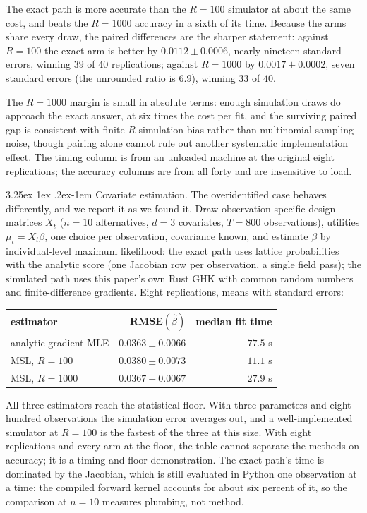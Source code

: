 \documentclass[11pt]{article}
\makeatletter
\renewcommand\paragraph{\@startsection{paragraph}{4}{\z@}%
  {3.25ex \@plus1ex \@minus.2ex}{-1em}%
  {\normalfont\normalsize\itshape}}
\makeatother
\begin{document}
\noindent The exact path is more accurate than the $R=100$ simulator at
about the same cost, and beats the $R=1000$ accuracy in a sixth of its
time. Because the arms share every draw, the paired differences
are the sharper statement: against $R=100$ the exact arm is better by
$0.0112\pm0.0006$, nearly nineteen standard errors, winning $39$ of $40$
replications; against $R=1000$ by $0.0017\pm0.0002$, seven standard
errors (the unrounded ratio is $6.9$), winning $33$ of $40$.

The $R=1000$ margin is small in absolute terms: enough simulation draws do approach the exact answer,
at six times the cost per fit, and the surviving paired gap is
consistent with finite-$R$ simulation bias rather than multinomial
sampling noise, though pairing alone cannot rule out another systematic
implementation effect. The timing column is from
an unloaded machine at the original eight replications; the accuracy
columns are from all forty and are insensitive to load.

\paragraph{Covariate estimation.} The overidentified case behaves
differently, and we report it as we found it. Draw observation-specific
design matrices $X_t$ ($n=10$ alternatives, $d=3$ covariates,
$T=800$ observations), utilities $\mu_t=X_t\beta$, one choice per
observation, covariance known, and estimate $\beta$ by individual-level
maximum likelihood: the exact path uses lattice probabilities with the
analytic score (one Jacobian row per observation, a single field pass);
the simulated path uses this paper's own Rust GHK with common random
numbers and finite-difference gradients. Eight replications, means with
standard errors:

\begin{center}\small
\begin{tabular}{lrr}
\toprule
estimator & RMSE$(\hat\beta)$ & median fit time \\
\midrule
analytic-gradient MLE & $0.0363\pm0.0066$ & $77.5$ s \\
MSL, $R=100$ & $0.0380\pm0.0073$ & $11.1$ s \\
MSL, $R=1000$ & $0.0367\pm0.0067$ & $27.9$ s \\
\bottomrule
\end{tabular}
\end{center}

\noindent All three estimators reach the statistical floor. With three
parameters and eight hundred observations the simulation error averages
out, and a well-implemented simulator at $R=100$ is the fastest of the
three at this size. With eight replications and every arm at the floor,
the table cannot separate the methods on accuracy; it is a timing and
floor demonstration. The exact path's time is dominated by the Jacobian,
which is still evaluated in Python one observation at a time: the
compiled forward kernel accounts for about six percent of it, so the
comparison at $n=10$ measures plumbing, not method.
\end{document}

